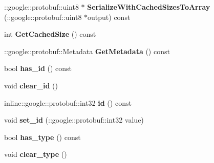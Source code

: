 \begin{DoxyCompactItemize}
\item 
\hypertarget{classexercise__protobuf_1_1_equipment_a01b12466e3bca65be96dfe1137c11678}{}\+::google\+::protobuf\+::uint8 $\ast$ {\bfseries Serialize\+With\+Cached\+Sizes\+To\+Array} (\+::google\+::protobuf\+::uint8 $\ast$output) const \label{classexercise__protobuf_1_1_equipment_a01b12466e3bca65be96dfe1137c11678}

\item 
\hypertarget{classexercise__protobuf_1_1_equipment_af54af5e38428b24a8094c9e86218be83}{}int {\bfseries Get\+Cached\+Size} () const \label{classexercise__protobuf_1_1_equipment_af54af5e38428b24a8094c9e86218be83}

\item 
\hypertarget{classexercise__protobuf_1_1_equipment_a7594133c99cde742d22d00c4854833da}{}\+::google\+::protobuf\+::\+Metadata {\bfseries Get\+Metadata} () const \label{classexercise__protobuf_1_1_equipment_a7594133c99cde742d22d00c4854833da}

\item 
\hypertarget{classexercise__protobuf_1_1_equipment_ad6e3390388ee6ace059a8f5e9a76aff1}{}bool {\bfseries has\+\_\+id} () const \label{classexercise__protobuf_1_1_equipment_ad6e3390388ee6ace059a8f5e9a76aff1}

\item 
\hypertarget{classexercise__protobuf_1_1_equipment_aa020e32b0f5ce92f65acc5d60905cd26}{}void {\bfseries clear\+\_\+id} ()\label{classexercise__protobuf_1_1_equipment_aa020e32b0f5ce92f65acc5d60905cd26}

\item 
\hypertarget{classexercise__protobuf_1_1_equipment_abf5f9c64761ec799143e120f56334fdc}{}inline\+::google\+::protobuf\+::int32 {\bfseries id} () const \label{classexercise__protobuf_1_1_equipment_abf5f9c64761ec799143e120f56334fdc}

\item 
\hypertarget{classexercise__protobuf_1_1_equipment_ac488d786fe74db48c938adae4255b400}{}void {\bfseries set\+\_\+id} (\+::google\+::protobuf\+::int32 value)\label{classexercise__protobuf_1_1_equipment_ac488d786fe74db48c938adae4255b400}

\item 
\hypertarget{classexercise__protobuf_1_1_equipment_a0dcc73af1c1261c194df9d3635df4228}{}bool {\bfseries has\+\_\+type} () const \label{classexercise__protobuf_1_1_equipment_a0dcc73af1c1261c194df9d3635df4228}

\item 
\hypertarget{classexercise__protobuf_1_1_equipment_a2d631bc102d777cc06b3db458461ad65}{}void {\bfseries clear\+\_\+type} ()\label{classexercise__protobuf_1_1_equipment_a2d631bc102d777cc06b3db458461ad65}


\end{DoxyCompactItemize}
